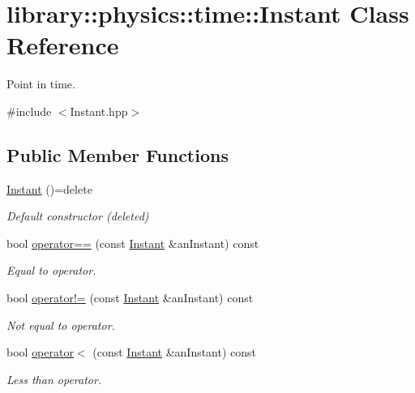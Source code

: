 \hypertarget{classlibrary_1_1physics_1_1time_1_1_instant}{}\section{library\+:\+:physics\+:\+:time\+:\+:Instant Class Reference}
\label{classlibrary_1_1physics_1_1time_1_1_instant}


Point in time.  




{\ttfamily \#include $<$Instant.\+hpp$>$}

\subsection*{Public Member Functions}
\begin{DoxyCompactItemize}
\item 
\hyperlink{classlibrary_1_1physics_1_1time_1_1_instant_a7916a9d8acb9de4eda35f9d72086a618}{Instant} ()=delete
\begin{DoxyCompactList}\small\item\em Default constructor (deleted) \end{DoxyCompactList}\item 
bool \hyperlink{classlibrary_1_1physics_1_1time_1_1_instant_ab948da61d082b526741348e55547b1b7}{operator==} (const \hyperlink{classlibrary_1_1physics_1_1time_1_1_instant}{Instant} \&an\+Instant) const
\begin{DoxyCompactList}\small\item\em Equal to operator. \end{DoxyCompactList}\item 
bool \hyperlink{classlibrary_1_1physics_1_1time_1_1_instant_a1d055c15365cc75756e6a85040e1ae04}{operator!=} (const \hyperlink{classlibrary_1_1physics_1_1time_1_1_instant}{Instant} \&an\+Instant) const
\begin{DoxyCompactList}\small\item\em Not equal to operator. \end{DoxyCompactList}\item 
bool \hyperlink{classlibrary_1_1physics_1_1time_1_1_instant_a6b211c85f6eaa9c5122c068280a65878}{operator$<$} (const \hyperlink{classlibrary_1_1physics_1_1time_1_1_instant}{Instant} \&an\+Instant) const
\begin{DoxyCompactList}\small\item\em Less than operator. \end{DoxyCompactList}\item 

\end{DoxyCompactItemize}
